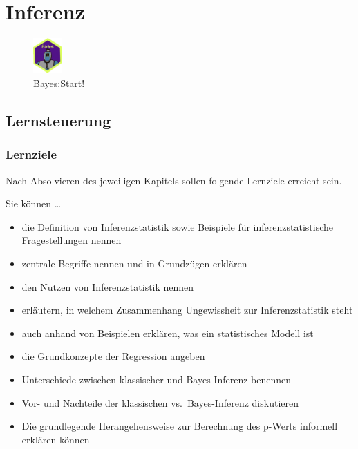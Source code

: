 \documentclass[
  a4paper,
  DIV=11]{scrreprt}
\providecommand{\tightlist}{%
  \setlength{\itemsep}{0pt}\setlength{\parskip}{0pt}}\usepackage{longtable,booktabs,array}
\theoremstyle{definition}
\theoremstyle{remark}
\begin{document}
\hypertarget{inferenz}{%
\chapter{Inferenz}\label{inferenz}}

\begin{figure}

{\centering \includegraphics[width=0.1\textwidth,height=\textheight]{./img/Golem_hex.png}

}

\caption{Bayes:Start!}

\end{figure}

\hypertarget{lernsteuerung}{%
\section{Lernsteuerung}\label{lernsteuerung}}

\hypertarget{lernziele-1}{%
\subsection{Lernziele}\label{lernziele-1}}

Nach Absolvieren des jeweiligen Kapitels sollen folgende Lernziele
erreicht sein.

Sie können \ldots{}

\begin{itemize}
\tightlist
\item
  die Definition von Inferenzstatistik sowie Beispiele für
  inferenzstatistische Fragestellungen nennen
\item
  zentrale Begriffe nennen und in Grundzügen erklären
\item
  den Nutzen von Inferenzstatistik nennen
\item
  erläutern, in welchem Zusammenhang Ungewissheit zur Inferenzstatistik
  steht
\item
  auch anhand von Beispielen erklären, was ein statistisches Modell ist
\item
  die Grundkonzepte der Regression angeben
\item
  Unterschiede zwischen klassischer und Bayes-Inferenz benennen
\item
  Vor- und Nachteile der klassischen vs.~Bayes-Inferenz diskutieren
\item
  Die grundlegende Herangehensweise zur Berechnung des p-Werts informell
  erklären können
\end{itemize}
\end{document}
